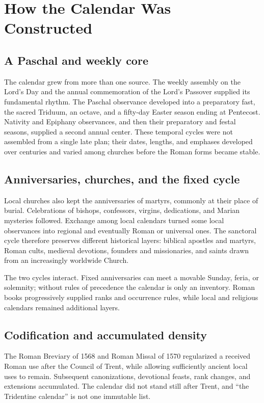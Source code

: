 \section{How the Calendar Was Constructed}

\subsection{A Paschal and weekly core}

The calendar grew from more than one source. The weekly assembly on the Lord's Day and the annual commemoration of the Lord's Passover supplied its fundamental rhythm. The Paschal observance developed into a preparatory fast, the sacred Triduum, an octave, and a fifty-day Easter season ending at Pentecost. Nativity and Epiphany observances, and then their preparatory and festal seasons, supplied a second annual center. These temporal cycles were not assembled from a single late plan; their dates, lengths, and emphases developed over centuries and varied among churches before the Roman forms became stable.

\subsection{Anniversaries, churches, and the fixed cycle}

Local churches also kept the anniversaries of martyrs, commonly at their place of burial. Celebrations of bishops, confessors, virgins, dedications, and Marian mysteries followed. Exchange among local calendars turned some local observances into regional and eventually Roman or universal ones. The sanctoral cycle therefore preserves different historical layers: biblical apostles and martyrs, Roman cults, medieval devotions, founders and missionaries, and saints drawn from an increasingly worldwide Church.

The two cycles interact. Fixed anniversaries can meet a movable Sunday, feria, or solemnity; without rules of precedence the calendar is only an inventory. Roman books progressively supplied ranks and occurrence rules, while local and religious calendars remained additional layers.

\subsection{Codification and accumulated density}

The Roman Breviary of 1568 and Roman Missal of 1570 regularized a received Roman use after the Council of Trent, while allowing sufficiently ancient local uses to remain. Subsequent canonizations, devotional feasts, rank changes, and extensions accumulated. The calendar did not stand still after Trent, and “the Tridentine calendar” is not one immutable list.

